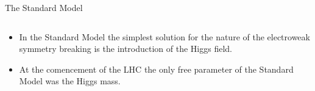 \begin{frame}{The Standard Model}
\begin{center}
\begin{columns}
\begin{column}{0.5\textwidth}
\begin{center}
\begin{itemize}
  \item
In the Standard Model the simplest solution for the nature of the electroweak symmetry breaking is the introduction of the Higgs field.
\item 
At the comencement of the LHC the only free parameter of the Standard Model was the Higgs mass.
\end{itemize}
\end{center}
  \end{column}
\end{columns}
\end{center}
\end{frame}






